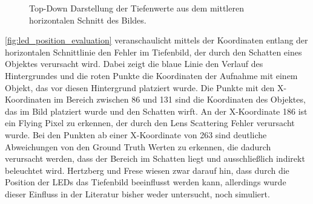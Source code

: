 \documentclass[thesis.tex]{subfiles}
\begin{document}
\begin{figure}[h!]
\centering
{}
\caption{Top-Down Darstellung der Tiefenwerte aus dem mittleren horizontalen Schnitt des Bildes.}
\label{fig:led_position_evaluation}
\end{figure}

\autoref{fig:led_position_evaluation} veranschaulicht mittels der Koordinaten entlang der horizontalen Schnittlinie den Fehler im Tiefenbild, der durch den Schatten eines Objektes verursacht wird. Dabei zeigt die blaue Linie den Verlauf des Hintergrundes und die roten Punkte die Koordinaten der Aufnahme mit einem Objekt, das vor diesen Hintergrund platziert wurde. Die Punkte mit den X-Koordinaten im Bereich zwischen 86 und 131 sind die Koordinaten des Objektes, das im Bild platziert wurde und den Schatten wirft. An der X-Koordinate 186 ist ein Flying Pixel zu erkennen, der durch den Lens Scattering Fehler verursacht wurde. Bei den Punkten ab einer X-Koordinate von 263 sind deutliche Abweichungen von den Ground Truth Werten zu erkennen, die dadurch verursacht werden, dass der Bereich im Schatten liegt und ausschließlich indirekt beleuchtet wird. Hertzberg und Frese \cite{bib:Hertzberg2014} wiesen zwar darauf hin, dass durch die Position der LEDs das Tiefenbild beeinflusst werden kann, allerdings wurde dieser Einfluss in der Literatur bisher weder untersucht, noch simuliert.

\subfilebib %
\end{document}
